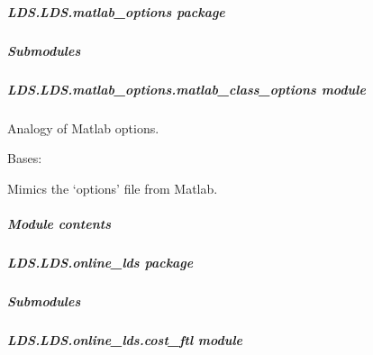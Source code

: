 \documentclass[letterpaper,10pt,english]{sphinxmanual}
\begin{document}
\subparagraph{LDS.LDS.matlab\_options package}
\label{\detokenize{LDS.LDS.matlab_options:lds-lds-matlab-options-package}}\label{\detokenize{LDS.LDS.matlab_options::doc}}

\subparagraph{Submodules}
\label{\detokenize{LDS.LDS.matlab_options:submodules}}

\subparagraph{LDS.LDS.matlab\_options.matlab\_class\_options module}
\label{\detokenize{LDS.LDS.matlab_options:module-LDS.LDS.matlab_options.matlab_class_options}}\label{\detokenize{LDS.LDS.matlab_options:lds-lds-matlab-options-matlab-class-options-module}}
\sphinxAtStartPar
Analogy of Matlab options.

\begin{fulllineitems}
\label{\detokenize{LDS.LDS.matlab_options:LDS.LDS.matlab_options.matlab_class_options.ClassOptions}}
\sphinxAtStartPar
Bases: 

\sphinxAtStartPar
Mimics the ‘options’ file from Matlab.

\end{fulllineitems}



\subparagraph{Module contents}
\label{\detokenize{LDS.LDS.matlab_options:module-LDS.LDS.matlab_options}}\label{\detokenize{LDS.LDS.matlab_options:module-contents}}

\subparagraph{LDS.LDS.online\_lds package}
\label{\detokenize{LDS.LDS.online_lds:lds-lds-online-lds-package}}\label{\detokenize{LDS.LDS.online_lds::doc}}

\subparagraph{Submodules}
\label{\detokenize{LDS.LDS.online_lds:submodules}}

\subparagraph{LDS.LDS.online\_lds.cost\_ftl module}
\label{\detokenize{LDS.LDS.online_lds:module-LDS.LDS.online_lds.cost_ftl}}\label{\detokenize{LDS.LDS.online_lds:lds-lds-online-lds-cost-ftl-module}}
\end{document}
